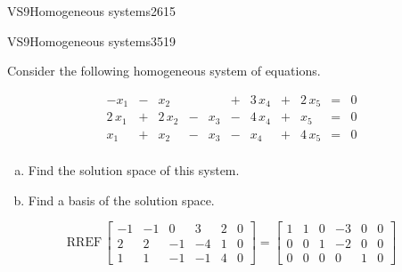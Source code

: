 \begin{exercise}{VS9}{Homogeneous systems}{2615}
\begin{exerciseAnswer}
     \end{exerciseAnswer}
 \end{exercise}


\begin{exercise}{VS9}{Homogeneous systems}{3519} 
\begin{exerciseStatement} 

Consider the following homogeneous system of equations.

 \[\begin{matrix}
 -x_{1} &  -  & x_{2} &  &  &  +  & 3 \, x_{4} &  +  & 2 \, x_{5} & = & 0 \\
 2 \, x_{1} &  +  & 2 \, x_{2} &  -  & x_{3} &  -  & 4 \, x_{4} &  +  & x_{5} & = & 0 \\
 x_{1} &  +  & x_{2} &  -  & x_{3} &  -  & x_{4} &  +  & 4 \, x_{5} & = & 0 \\
 \end{matrix}\] 

\begin{enumerate}[(a)]
\item  Find the solution space of this system.
\item  Find a basis of the solution space.
\end{enumerate}

     \end{exerciseStatement}
 \begin{exerciseAnswer} 

\[\mathrm{RREF}\,\left[\begin{array}{ccccc|c}
-1 & -1 & 0 & 3 & 2 & 0 \\
2 & 2 & -1 & -4 & 1 & 0 \\
1 & 1 & -1 & -1 & 4 & 0
\end{array}\right]=\left[\begin{array}{ccccc|c}
1 & 1 & 0 & -3 & 0 & 0 \\
0 & 0 & 1 & -2 & 0 & 0 \\
0 & 0 & 0 & 0 & 1 & 0
\end{array}\right]\]

 


\end{exerciseAnswer}
\end{exercise}
